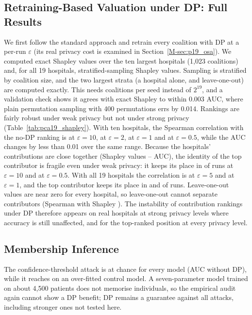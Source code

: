\subsection{Retraining-Based Valuation under DP: Full Results}
\label{sec:retrain_full}
We first follow the standard approach and retrain every coalition with DP at a per-run $\varepsilon$ (its real privacy cost is examined in Section~\ref{M-sec:p19_osa}). We computed exact Shapley values over the ten largest hospitals (1{,}023 coalitions) and, for all 19 hospitals, stratified-sampling Shapley values. Sampling is stratified by coalition size, and the two largest strata (a hospital alone, and leave-one-out) are computed exactly. This needs \pShNineCoal{} coalitions per seed instead of $2^{19}$, and a validation check shows it agrees with exact Shapley to within 0.003 AUC, where plain permutation sampling with 400 permutations errs by 0.014. Rankings are fairly robust under weak privacy but not under strong privacy (Table~\ref{tab:pca19_shapley}). With ten hospitals, the Spearman correlation with the no-DP ranking is \pShRhoTen{} at $\varepsilon=10$, \pShRhoTwo{} at $\varepsilon=2$, \pShRhoOne{} at $\varepsilon=1$ and \pShRhoHalf{} at $\varepsilon=0.5$, while the AUC changes by less than 0.01 over the same range. Because the hospitals' contributions are close together (Shapley values \pShPhiMin--\pShPhiMax{} AUC), the identity of the top contributor is fragile even under weak privacy: it keeps its place in \pShTSTen{} of runs at $\varepsilon=10$ and \pShTSHalf{} at $\varepsilon=0.5$. With all 19 hospitals the correlation is \pShNineRhoFive{} at $\varepsilon=5$ and \pShNineRhoOne{} at $\varepsilon=1$, and the top contributor keeps its place in \pShNineTSFive{} and \pShNineTSOne{} of runs. Leave-one-out values are near zero for every hospital, so leave-one-out cannot separate contributors (Spearman with Shapley \pShLooRho). The instability of contribution rankings under DP therefore appears on real hospitals at strong privacy levels where accuracy is still unaffected, and for the top-ranked position at every privacy level.




\subsection{Membership Inference}
The confidence-threshold attack is at chance for every model (AUC \pMiaNoDP{} without DP), while it reaches \pMiaCtl{} on an over-fitted control model. A seven-parameter model trained on about 4{,}500 patients does not memorise individuals, so the empirical audit again cannot show a DP benefit; DP remains a guarantee against all attacks, including stronger ones not tested here.
